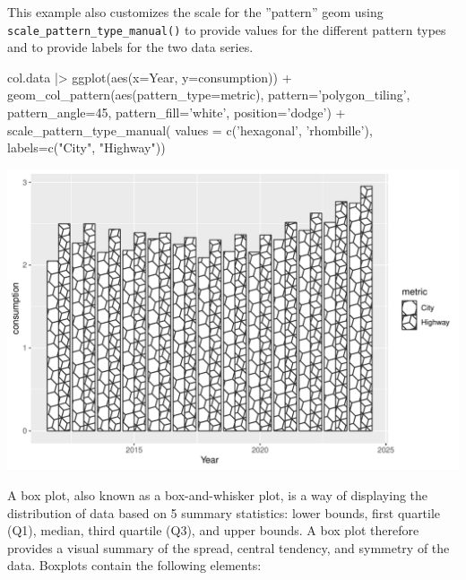 This example also customizes the scale for the ''pattern'' geom using  \texttt{scale\_pattern\_type\_manual()} to provide values for the different pattern types and to provide labels for the two data series. 

\begin{samepage}
\begin{Rcode}
col.data |> 
  ggplot(aes(x=Year, y=consumption)) +
    geom_col_pattern(aes(pattern_type=metric),
          pattern='polygon_tiling', pattern_angle=45, 
          pattern_fill='white', position='dodge') +
    scale_pattern_type_manual(
       values = c('hexagonal', 'rhombille'), 
       labels=c("City", "Highway"))
\end{Rcode}
\end{samepage}

\begin{center}
  \includegraphics[width=.8\textwidth]{fuel.columnsPatterns.pdf}
\end{center}

A box plot, also known as a box-and-whisker plot, is a way of displaying the distribution of data based on 5 summary statistics: lower bounds, first quartile (Q1), median, third quartile (Q3), and upper bounds. A box plot therefore provides a visual summary of the spread, central tendency, and symmetry of the data. Boxplots contain the following elements:

